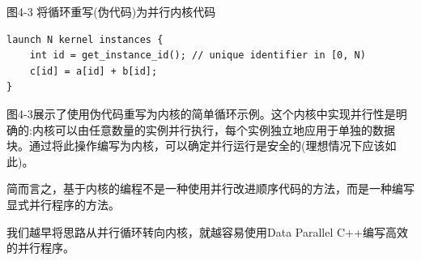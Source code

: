 \hspace*{\fill} \par %
图4-3 将循环重写(伪代码)为并行内核代码
\begin{lstlisting}[caption={}]
launch N kernel instances {
	int id = get_instance_id(); // unique identifier in [0, N)
	c[id] = a[id] + b[id];
}
\end{lstlisting}

图4-3展示了使用伪代码重写为内核的简单循环示例。这个内核中实现并行性是明确的:内核可以由任意数量的实例并行执行，每个实例独立地应用于单独的数据块。通过将此操作编写为内核，可以确定并行运行是安全的(理想情况下应该如此)。\par

简而言之，基于内核的编程不是一种使用并行改进顺序代码的方法，而是一种编写显式并行程序的方法。\par

\begin{tcolorbox}[colback=red!5!white,colframe=red!75!black]
我们越早将思路从并行循环转向内核，就越容易使用Data Parallel C++编写高效的并行程序。
\end{tcolorbox}
























